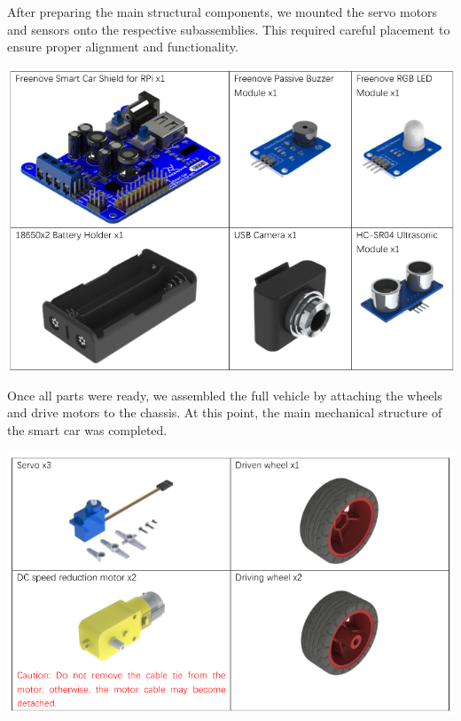     \vspace{1.5em}

    \noindent
    \begin{minipage}[t]{0.63\textwidth}
        \vspace*{0pt}
        After preparing the main structural components, we mounted the servo motors and sensors onto the respective subassemblies. This required careful placement to ensure proper alignment and functionality.
    \end{minipage}
    \hfill
    \begin{minipage}[t]{0.33\textwidth}
        \vspace*{0pt}
        \includegraphics[width=\linewidth]{img/shield_and_sensors}
    \end{minipage}

    \vspace{1.5em}

    \noindent
    \begin{minipage}[t]{0.63\textwidth}
        \vspace*{0pt}
        Once all parts were ready, we assembled the full vehicle by attaching the wheels and drive motors to the chassis. At this point, the main mechanical structure of the smart car was completed.
    \end{minipage}
    \hfill
    \begin{minipage}[t]{0.33\textwidth}
        \vspace*{0pt}
        \includegraphics[width=\linewidth]{img/engine_and_wheels}
    \end{minipage}

